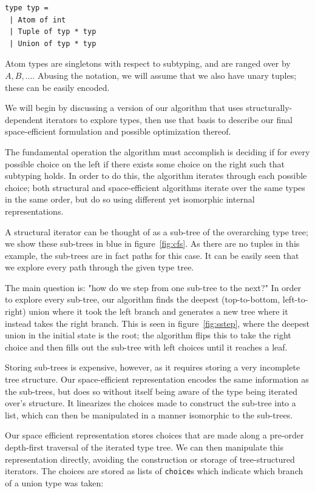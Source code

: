 \documentclass[a4paper,english]{lipics-v2019}
\begin{document}
\begin{lstlisting}
type typ =
 | Atom of int
 | Tuple of typ * typ
 | Union of typ * typ
\end{lstlisting}

Atom types are singletons with respect to subtyping, and are ranged
over by
\(A, B, ...\).  Abusing the
notation, we will assume that we also have unary
tuples; these can be easily encoded. 


We will begin by discussing a version of our algorithm that uses structurally-
dependent iterators to explore types, then use that basis to describe our
final space-efficient formulation and possible optimization thereof. 

The fundamental operation the algorithm must accomplish is deciding if
for every possible choice on the left if there exists some choice on the
right such that subtyping holds. In order to do this, the algorithm iterates
through each possible choice; both structural and space-efficient algorithms
iterate over the same types in the same order, but do so using different yet 
isomorphic internal representations.

A structural iterator can be thought of as a sub-tree of the overarching type
tree; we show these sub-trees in blue in figure~\ref{fig:cfs}. As there are no
tuples in this example, the sub-trees are in fact paths for this case. It can
be easily seen that we explore every path through the given type tree.

The main question is: "how do we step from one sub-tree to the next?" In order
to explore every sub-tree, our algorithm finds the deepest (top-to-bottom,
left-to-right) union where it took the left branch and generates a new tree
where it instead takes the right branch. This is seen in
figure~\ref{fig:sstep}, where the deepest union in the initial state is the
root; the algorithm flips this to take the right choice and then fills out the
sub-tree with left choices until it reaches a  leaf.

Storing sub-trees is expensive, however, as it requires storing a very
incomplete tree structure. Our space-efficient representation encodes the
same information as the sub-trees, but does so without itself being aware of
the type being iterated over's structure. It linearizes the choices made to
construct the sub-tree into a list, which can then be manipulated in a
manner isomorphic to the sub-trees.

Our space efficient representation stores choices that are made along a
pre-order depth-first traversal of the iterated type tree. We can then
manipulate this representation directly, avoiding the construction or
storage of tree-structured iterators. The choices are stored as lists of
\verb|choice|s which indicate which branch of a union type was taken:
\end{document}
